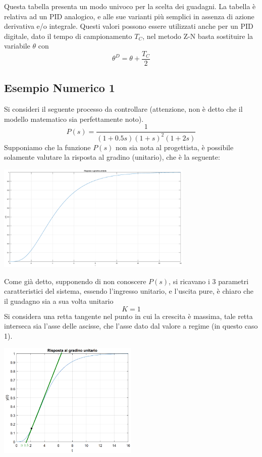 \documentclass[10pt, letterpaper]{report}
\begin{document}
Questa tabella presenta un modo univoco per la scelta dei guadagni. La tabella è relativa ad un PID analogico, e alle sue varianti più semplici in assenza di azione derivativa e/o integrale.\acc 
Questi valori possono essere utilizzati anche per un PID digitale, dato il tempo di campionamento $T_C$, nel metodo Z-N basta sostituire la variabile $\theta$ con 
$$ \theta^D=\theta+\frac{T_C}{2}$$
\subsection{Esempio Numerico 1}\label{esNum1}
Si consideri il seguente processo da controllare (attenzione, non è detto che il modello matematico sia perfettamente noto).
$$P(s)=\frac{1}{(1+0.5s)(1+s)^2(1+2s)}$$
Supponiamo che la funzione $P(s)$ non sia nota al progettista, è possibile solamente valutare la risposta al gradino (unitario), che è la seguente:\begin{center}
    \includegraphics[width=0.7\textwidth]{images/ZN2.eps}
\end{center}
Come già detto, supponendo di non conoscere $P(s)$, si ricavano i 3 parametri caratteristici del sistema, essendo l'ingresso unitario, e l'uscita pure, è chiaro che il guadagno sia a sua volta unitario $$ K=1$$
Si considera una retta tangente nel punto in cui la crescita è massima, tale retta interseca sia l'asse delle ascisse, che l'asse dato dal valore a regime (in questo caso 1). 
\begin{center}
    \includegraphics[width=0.5\textwidth]{images/ZN3.eps}
\end{center}
\end{document}
